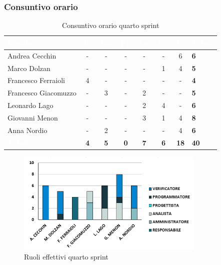 \subsubsection{Consuntivo orario}
{
\setlength{\tabcolsep}{10pt}
\renewcommand{\arraystretch}{1.5}
\begin{table}[h!]
    \centering
    \begin{tabularx}{\textwidth}{| l | c | c | c | c | c | c | X |}
        \hline
        \rowcolor{headerrow} \textbf{\textcolor{white}{Membro}} & \textbf{\textcolor{white}{R.}} & \textbf{\textcolor{white}{Am.}} & \textbf{\textcolor{white}{Pj.}} & \textbf{\textcolor{white}{An.}} & \textbf{\textcolor{white}{Pg.}} & \textbf{\textcolor{white}{V.}} & \textbf{\textcolor{white}{Totale}} \\
        \hline
        Andrea Cecchin & - & -  & - & - & - & 6 & \textbf{6} \\
        \hline
        Marco Dolzan & - & - & - & - & 1 & 4 & \textbf{5} \\
        \hline
        Francesco Ferraioli & 4 & - & - & - & - & - & \textbf{4} \\
        \hline  
        Francesco Giacomuzzo & - & 3 & - & 2 & - & - & \textbf{5} \\
        \hline
        Leonardo Lago & - & - & - & 2 & 4 & - & \textbf{6} \\
        \hline
        Giovanni Menon & - & - & - & 3 & 1 & 4 & \textbf{8} \\
        \hline
        Anna Nordio & - & 2 & - & - & - & 4 & \textbf{6} \\
        \hline
    \cellcolor{headerrow} \textbf{\textcolor{white}{Totale}} & \textbf{4} & \textbf{5} & \textbf{0} & \textbf{7} & \textbf{6} & \textbf{18} & \textbf{40} \\
        \hline
    \end{tabularx} 
    \caption{Consuntivo orario quarto sprint}
    \label{tab:consuntivoorarioquartosprint}
\end{table}
}

\begin{figure}[h!]
    \centering
    \includegraphics[width=0.8\textwidth]{cons4ruoli.png}
    \caption{Ruoli effettivi quarto sprint}
    \label{fig:consuntivoorarioquartosprint}
\end{figure}

